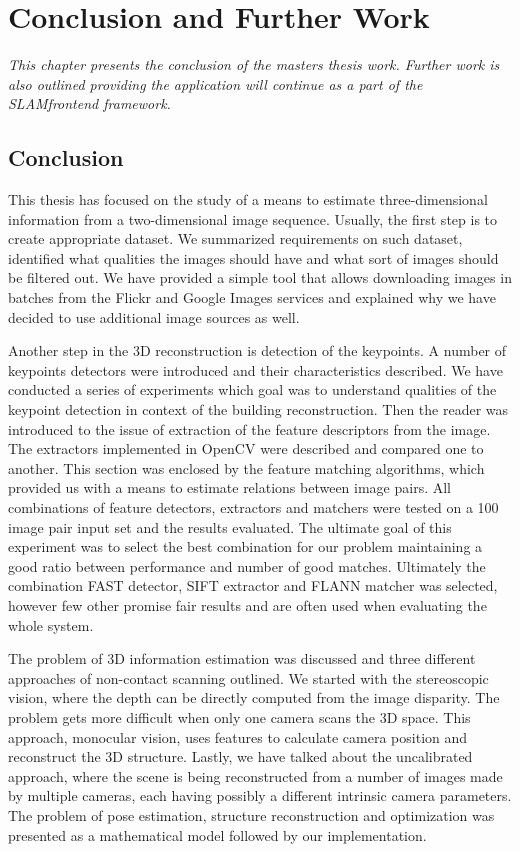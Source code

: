 \chapter{Conclusion and Further Work}
\label{chapter:conclusion}
\textit{This chapter presents the conclusion of the masters thesis work. Further work is also outlined providing the application will continue as a part of the SLAM\textunderscore frontend framework.}

\section{Conclusion}
This thesis has focused on the study of a means to estimate three-dimensional information from a two-dimensional image sequence. Usually, the first step is to create appropriate dataset. We summarized requirements on such dataset, identified what qualities the images should have and what sort of images should be filtered out. We have provided a simple tool that allows downloading images in batches from the Flickr and Google Images services and explained why we have decided to use additional image sources as well. 

Another step in the 3D reconstruction is detection of the keypoints. A number of keypoints detectors were introduced and their characteristics described. We have conducted a series of experiments which goal was to understand qualities of the keypoint detection in context of the building reconstruction. Then the reader was introduced to the issue of extraction of the feature descriptors from the image. The extractors implemented in OpenCV were described and compared one to another. This section was enclosed by the feature matching algorithms, which provided us with a means to estimate relations between image pairs. All combinations of feature detectors, extractors and matchers were tested on a 100 image pair input set and the results evaluated. The ultimate goal of this experiment was to select the best combination for our problem maintaining a good ratio between performance and number of good matches. Ultimately the combination FAST detector, SIFT extractor and FLANN matcher was selected, however few other promise fair results and are often used when evaluating the whole system.

The problem of 3D information estimation was discussed and three different approaches of non-contact scanning outlined. We started with the stereoscopic vision, where the depth can be directly computed from the image disparity. The problem gets more difficult when only one camera scans the 3D space. This approach, monocular vision, uses features to calculate camera position and reconstruct the 3D structure. Lastly, we have talked about the uncalibrated approach, where the scene is being reconstructed from a number of images made by multiple cameras, each having possibly a different intrinsic camera parameters. The problem of pose estimation, structure reconstruction and optimization was presented as a mathematical model followed by our implementation. 

